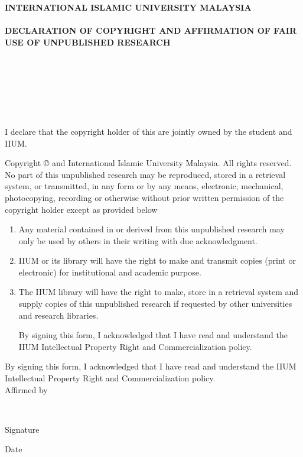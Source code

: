 \documentclass[12pt, a4paper]{memoir}
\begin{document}
\thispagestyle{empty}

\begin{center}
\begin{Large}
\textbf{\MakeUppercase{International Islamic University Malaysia}}\\~\\
\textbf{\MakeUppercase{Declaration of Copyright and Affirmation of Fair Use of 
Unpublished Research}}\\~\\
\textbf{\MakeUppercase{\myTitle}}\\
\ifdefined\mySubtitle
\textbf{\MakeUppercase{\mySubtitle}}\\~\\
\else
\\~\\
\fi
\end{Large}
\noindent I declare that the copyright holder of this 
\myDocument are jointly owned by the student and IIUM.\\
\end{center}

{\fontsize{10bp}{12bp}\selectfont
\noindent Copyright \copyright{} \myYear \myName and International Islamic 
University 
Malaysia. All rights reserved.}\\

\noindent No part of this unpublished research may be reproduced, stored in a 
retrieval
system, or transmitted, in any form or by any means, electronic, mechanical,
photocopying, recording or otherwise without prior written permission of the
copyright holder except as provided below

\begin{enumerate}
\item Any material contained in or derived from this unpublished research
may only be used by others in their writing with due acknowledgment.

\item IIUM or its library will have the right to make and transmit copies
(print or electronic) for institutional and academic purpose.

\item The IIUM library will have the right to make, store in a retrieval system
and supply copies of this unpublished research if requested by other
universities and research libraries.

By signing this form, I acknowledged that I have read and understand the
IIUM Intellectual Property Right and Commercialization policy.
\end{enumerate}

\noindent By signing this form, I acknowledged that I have read and understand 
the
IIUM Intellectual Property Right and Commercialization policy.\\[48pt]

\noindent Affirmed by \myName\\

\vfill

\noindent \makebox[2in]{\dotfill} \hfill \makebox[2in]{\dotfill}\\
\parbox{2in}{\centering Signature} \hfill \parbox{2in}{\centering Date}
\end{document}
